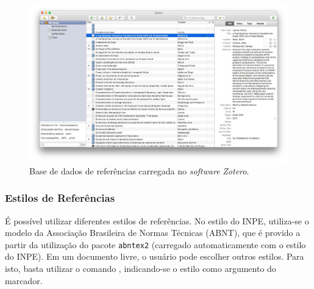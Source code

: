 \begin{figure}[H]
\caption{Base de dados de referências carregada no \textit{software} \textit{Zotero}.}
\vspace{6mm}
    \begin{center}
        \includegraphics[scale=0.25]{./figs/zotero.pdf}
    \end{center}
\vspace{4mm}
\label{fig:exe_zotero}
\end{figure}

\subsubsection*{Estilos de Referências}
\label{sec:estilos_refs}

É possível utilizar diferentes estilos de referências. No estilo do INPE, utiliza-se o modelo da Associação Brasileira de Normas Técnicas (ABNT), que é provido a partir da utilização do pacote {\tt abntex2} (carregado automaticamente com o estilo do INPE). Em um documento livre, o usuário pode escolher outros estilos. Para isto, basta utilizar o comando \texttt{}, indicando-se o estilo como argumento do marcador.



